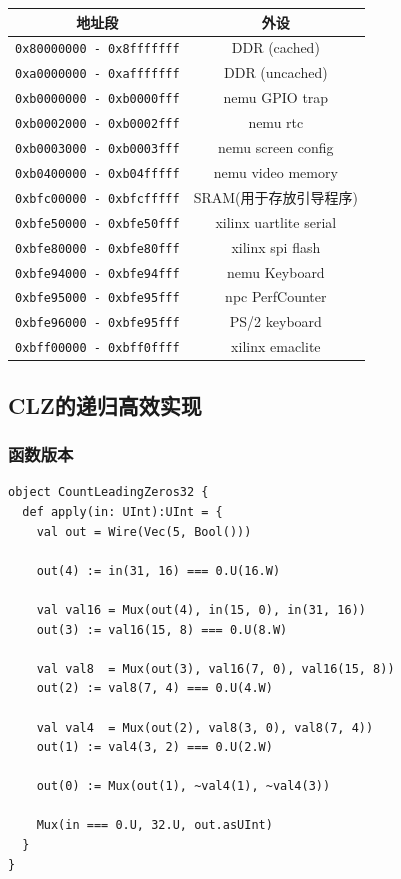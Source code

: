 \documentclass[lang=cn,11pt,a4paper]{elegantpaper}
\begin{document}
\begin{table}[H]
\centering
\begin{tabular}{|c|c|}
\hline
 地址段 & 外设 \\\hline
\lstinline!0x80000000 - 0x8fffffff! & DDR (cached) \\\hline
\lstinline!0xa0000000 - 0xafffffff! & DDR (uncached) \\\hline
\lstinline!0xb0000000 - 0xb0000fff! & nemu GPIO trap \\\hline
\lstinline!0xb0002000 - 0xb0002fff! & nemu rtc \\\hline
\lstinline!0xb0003000 - 0xb0003fff! & nemu screen config \\\hline
\lstinline!0xb0400000 - 0xb04fffff! & nemu video memory \\\hline
\lstinline!0xbfc00000 - 0xbfcfffff! & SRAM(用于存放引导程序) \\\hline
\lstinline!0xbfe50000 - 0xbfe50fff! & xilinx uartlite serial \\\hline
\lstinline!0xbfe80000 - 0xbfe80fff! & xilinx spi flash \\\hline
\lstinline!0xbfe94000 - 0xbfe94fff! & nemu Keyboard \\\hline
\lstinline!0xbfe95000 - 0xbfe95fff! & npc PerfCounter \\\hline
\lstinline!0xbfe96000 - 0xbfe95fff! & PS/2 keyboard \\\hline
\lstinline!0xbff00000 - 0xbff0ffff! & xilinx emaclite \\\hline
\end{tabular}
\end{table}

\subsection{CLZ的递归高效实现}
\subsubsection{函数版本}

\begin{lstlisting}
object CountLeadingZeros32 {
  def apply(in: UInt):UInt = {
    val out = Wire(Vec(5, Bool()))

    out(4) := in(31, 16) === 0.U(16.W)

    val val16 = Mux(out(4), in(15, 0), in(31, 16))
    out(3) := val16(15, 8) === 0.U(8.W)

    val val8  = Mux(out(3), val16(7, 0), val16(15, 8))
    out(2) := val8(7, 4) === 0.U(4.W)

    val val4  = Mux(out(2), val8(3, 0), val8(7, 4))
    out(1) := val4(3, 2) === 0.U(2.W)

    out(0) := Mux(out(1), ~val4(1), ~val4(3))

    Mux(in === 0.U, 32.U, out.asUInt)
  }
}
\end{lstlisting}
\end{document}
